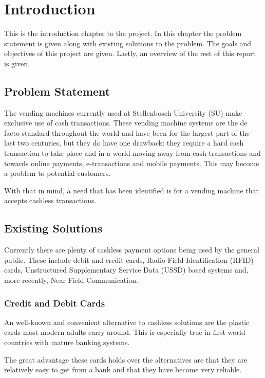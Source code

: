 \chapter{Introduction}

This is the introduction chapter to the project. In this chapter the problem statement is
given along with existing solutions to the problem. The goals and objectives of this project
are given. Lastly, an overview of the rest of this report is given. 

\section{Problem Statement}

The vending machines currently used at Stellenbosch University (SU) make exclusive use of
cash transactions. These vending machine systems are the de facto standard throughout the
world and have been for the largest part of the last two centuries, but they do have one
drawback: they require a hard cash transaction to take place and in a world moving away from
cash transactions and towards online payments, e-transactions and mobile payments. This may
become a problem to potential customers.

With that in mind, a need that has been identified is for a vending machine that accepts
cashless transactions.

\section{Existing Solutions}

Currently there are plenty of cashless payment options being used by the general public. These
include debit and credit cards, Radio Field Identification (RFID) cards, Unstructured
Supplementary Service Data (USSD) based systems and, more recently, Near Field Communication.

\subsection{Credit and Debit Cards}

An well-known and convenient alternative to cashless solutions are the plastic cards most
modern adults carry around. This is especially true in first world countries with mature
banking systems. 

The great advantage these cards holds over the alternatives are that they are
relatively easy to get from a bank and that they have become very reliable. 

